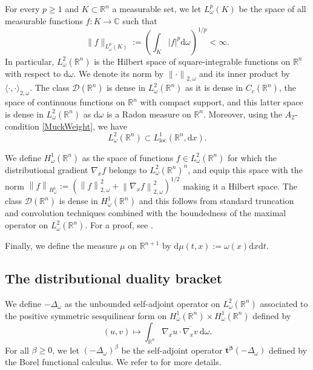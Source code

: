 \documentclass[12pt, letterpaper]{amsart}
\theoremstyle{definition}
\theoremstyle{remark}
\numberwithin{equation}{section}
\begin{document}
For every $p\ge 1$ and $K \subset \mathbb{R}^n$ a measurable set, we let $L^p_\omega(K)$ be the space of all measurable functions $f:K \rightarrow \mathbb{C}$ such that $$\|f\|_{L^p_\omega(K)}:=\left ( \int_K |f|^p \mathrm d \omega  \right )^{1/p}<\infty.$$
In particular, $L^2_\omega(\mathbb{R}^n)$ is the Hilbert space of square-integrable functions on $\mathbb{R}^n$ with respect to $\mathrm{d}\omega$. We denote its norm by ${\lVert \cdot \rVert}_{2,\omega}$ and its inner product by $\langle \cdot , \cdot \rangle_{2,\omega}$. The class $\mathcal{D}(\mathbb{R}^n)$ is dense in $L^2_{\omega}(\mathbb{R}^n)$ as it is dense in $C_c(\mathbb{R}^n)$, the space of continuous functions on $\mathbb{R}^n$ with compact support, and this latter space is dense in $L^2_{\omega}(\mathbb{R}^n)$ as $\mathrm d \omega$ is a Radon measure on $\mathbb{R}^n$. Moreover, using the $A_2$-condition \eqref{MuckWeight}, we have 
\begin{equation*}
L^2_{\omega}(\mathbb{R}^n) \subset L^1_{\text{loc}}(\mathbb{R}^n, \mathrm{d}x).
\end{equation*}

We define $H^1_{\omega}(\mathbb{R}^n)$ as the space of functions $f \in L^2_\omega(\mathbb{R}^n)$ for which the distributional gradient $\nabla_x f$ belongs to $L^2_\omega(\mathbb{R}^n)^n$, and equip this space with the norm
$\left\| f \right\|_{H^1_\omega} := ( \left\| f \right\|_{2,\omega}^2 + \left\| \nabla_x f \right\|_{2,\omega}^2 )^{1/2}$ making it a Hilbert space. The class $\mathcal{D}(\mathbb{R}^n)$ is dense in $H^1_{\omega}(\mathbb{R}^n)$ and this follows from standard truncation and convolution techniques combined with the boundedness of the maximal operator on $L^2_\omega(\mathbb{R}^n)$. For a proof, see \cite[Thm. 2.5]{kilpelainen1994weighted}.


Finally, we define the measure $\mu$ on $\mathbb{R}^{n+1}$ by $\mathrm{d} \mu(t,x):= \omega(x)\mathrm{d}x\mathrm{d}t.$
\subsection{The distributional duality bracket}
We define $-\Delta_\omega$ as the unbounded self-adjoint operator on $L^2_\omega(\mathbb{R}^n)$ associated to the positive symmetric sesquilinear form on $H^1_\omega(\mathbb{R}^n) \times H^1_\omega(\mathbb{R}^n)$ defined by
\begin{equation*}
    (u,v) \mapsto \int_{\mathbb{R}^n} \nabla_x u \cdot \overline{\nabla_x v}  \ \mathrm d \omega.
\end{equation*}
For all $\beta \geq 0$, we let $(-\Delta_\omega)^\beta$ be the self-adjoint operator $\mathbf{t^{\beta}}(-\Delta_\omega)$ defined by the Borel functional calculus. We refer to \cite{reed1980methods} for more details. 
\end{document}

